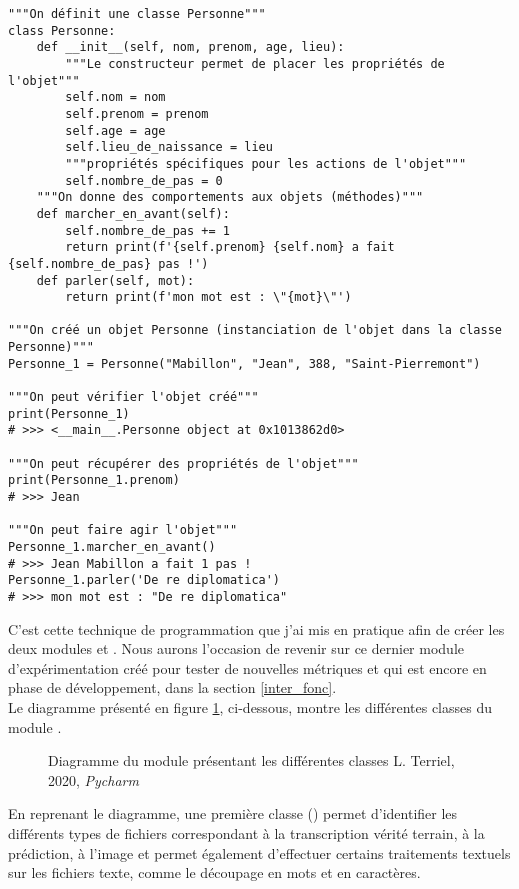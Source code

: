 \lstset{language=Python}
\begin{lstlisting}
"""On définit une classe Personne"""
class Personne:
    def __init__(self, nom, prenom, age, lieu):
        """Le constructeur permet de placer les propriétés de l'objet"""
        self.nom = nom
        self.prenom = prenom
        self.age = age
        self.lieu_de_naissance = lieu
        """propriétés spécifiques pour les actions de l'objet"""
        self.nombre_de_pas = 0
    """On donne des comportements aux objets (méthodes)"""
    def marcher_en_avant(self):
        self.nombre_de_pas += 1
        return print(f'{self.prenom} {self.nom} a fait {self.nombre_de_pas} pas !')
    def parler(self, mot):
        return print(f'mon mot est : \"{mot}\"')

"""On créé un objet Personne (instanciation de l'objet dans la classe Personne)"""
Personne_1 = Personne("Mabillon", "Jean", 388, "Saint-Pierremont")

"""On peut vérifier l'objet créé"""
print(Personne_1)
# >>> <__main__.Personne object at 0x1013862d0>

"""On peut récupérer des propriétés de l'objet"""
print(Personne_1.prenom)
# >>> Jean

"""On peut faire agir l'objet"""
Personne_1.marcher_en_avant()
# >>> Jean Mabillon a fait 1 pas !
Personne_1.parler('De re diplomatica')
# >>> mon mot est : "De re diplomatica"
\end{lstlisting}

C'est cette technique de programmation que j'ai mis en pratique afin de créer les deux modules  et . Nous aurons l'occasion de revenir sur ce dernier module d'expérimentation créé pour tester de nouvelles métriques et qui est encore en phase de développement, dans la section \ref{inter_fonc}.\\

Le diagramme présenté en figure \ref{fig:diag_synsem}, ci-dessous, montre les différentes classes du module 
.

\begin{figure}[H]
    \centering
    \centerline{}
    \caption{Diagramme du module  présentant les différentes classes \textcopyright L. Terriel, 2020, \textit{Pycharm}}
    \label{fig:diag_synsem}
\end{figure}

En reprenant le diagramme, une première classe () permet d'identifier les différents types de fichiers correspondant à la transcription vérité terrain, à la prédiction, à l'image et permet également d'effectuer certains traitements textuels sur les fichiers texte, comme le découpage en mots et en caractères. 

